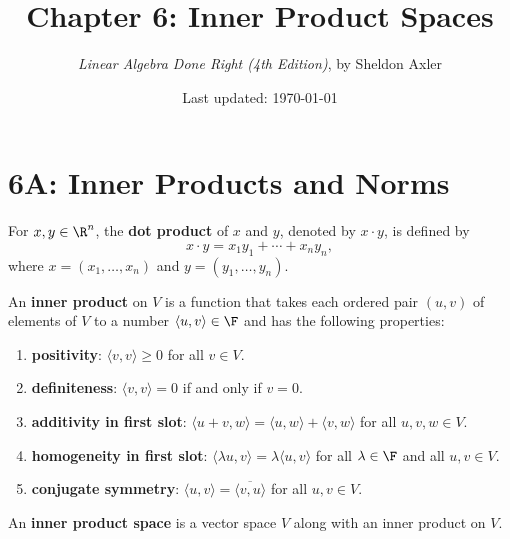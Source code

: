 \documentclass{extarticle}
\title{\vspace{-2em}Chapter 6: Inner Product Spaces}
\author{\emph{Linear Algebra Done Right (4th Edition)}, by Sheldon Axler}
\date{Last updated: \today}
\begin{document}
\maketitle
\tableofcontents
\newpage


\section*{6A: Inner Products and Norms}

\begin{definition}
    For \(x, y \in \R^n\), the \textbf{dot product} of \(x\) and \(y\), denoted by
    \(x \cdot y\), is defined by
    \[x \cdot y = x_1 y_1 + \cdots + x_n y_n,\]
    where \(x = (x_1, \ldots, x_n)\) and \(y = (y_1, \ldots, y_n)\).
\end{definition}

\begin{definition}
    An \textbf{inner product} on \(V\) is a function that takes each ordered pair \((u, v)\) of elements of
    \(V\) to a number \(\langle u,v \rangle \in \F\) and has the following properties:
    \begin{enumerate}[label=(\alph*)]
        \item \textbf{positivity}: \(\langle v,v \rangle \geq 0\) for all  \(v \in V\).
        \item \textbf{definiteness}: \(\langle v,v \rangle = 0\) if and only if \(v = 0\).
        \item \textbf{additivity in first slot}: \(\langle u+v,w \rangle = \langle u, w\rangle
        + \langle v,w \rangle\) for all \(u, v, w \in V\).
        \item \textbf{homogeneity in first slot}: \(\langle \lambda u,v \rangle
        = \lambda \langle u,v \rangle\) for all \(\lambda \in \F\) and all \(u, v \in V\).
        \item \textbf{conjugate symmetry}: \(\langle u,v \rangle = \overline{\langle v,u\rangle}\)
        for all \(u, v \in V\).
    \end{enumerate}
\end{definition}

\begin{definition}
    An \textbf{inner product space} is a vector space \(V\) along with an inner product on \(V\).
\end{definition}
\end{document}
